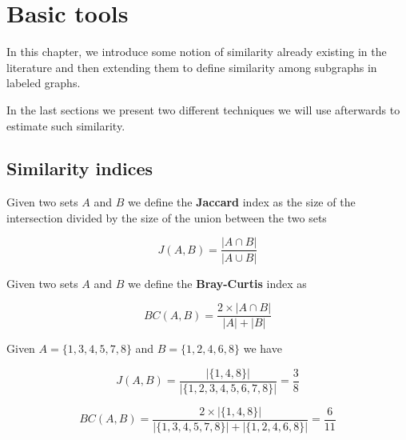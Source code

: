 
\chapter{Basic tools}

In this chapter, we introduce some notion of similarity already existing in the literature and then extending them to define similarity among subgraphs in labeled graphs.

In the last sections we present two different techniques we will use afterwards to estimate such similarity.

\section{Similarity indices}

\begin{definizione}\label{def:jaccard}
	Given two sets $A$ and $B$ we define the \textbf{Jaccard} index as the size of the intersection divided by the size of the union between the two sets
	
	\begin{equation}
	J(A,B) = \frac{|A \cap B|}{|A \cup B|}
	\end{equation}
	
\end{definizione}

\begin{definizione}\label{def:bray}
	Given two sets $A$ and $B$ we define the \textbf{Bray-Curtis} index as
	
	\begin{equation}
	BC(A,B) = \frac{2 \times |A \cap B|}{|A| + |B|}
	\end{equation}
	
\end{definizione}

\begin{esempio}
	Given $A = \{1, 3, 4, 5, 7, 8\}$ and $B = \{1, 2, 4, 6, 8\}$ we have
	
	\begin{equation*}
	J(A,B) = \frac{|\{1, 4, 8\}|}{|\{1, 2, 3, 4, 5, 6, 7, 8\}|} = \frac{3}{8} 
	\end{equation*}
	
	\begin{equation*}
	BC(A,B) = \frac{2 \times |\{1, 4, 8\}|}{|\{1, 3, 4, 5, 7, 8\}| + |\{1, 2, 4, 6, 8\}|} = \frac{6}{11} 
	\end{equation*}
\end{esempio}

